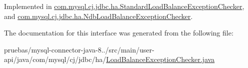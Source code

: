 Implemented in \mbox{\hyperlink{classcom_1_1mysql_1_1cj_1_1jdbc_1_1ha_1_1_standard_load_balance_exception_checker_a24152ea8a4fd653b8597301b47c9624f}{com.\+mysql.\+cj.\+jdbc.\+ha.\+Standard\+Load\+Balance\+Exception\+Checker}}, and \mbox{\hyperlink{classcom_1_1mysql_1_1cj_1_1jdbc_1_1ha_1_1_ndb_load_balance_exception_checker_ace9aa78b697232aab5423f06dd998f82}{com.\+mysql.\+cj.\+jdbc.\+ha.\+Ndb\+Load\+Balance\+Exception\+Checker}}.



The documentation for this interface was generated from the following file\+:\begin{DoxyCompactItemize}
\item 
pruebas/mysql-\/connector-\/java-\/8../src/main/user-\/api/java/com/mysql/cj/jdbc/ha/\mbox{\hyperlink{_load_balance_exception_checker_8java}{Load\+Balance\+Exception\+Checker.\+java}}\end{DoxyCompactItemize}
